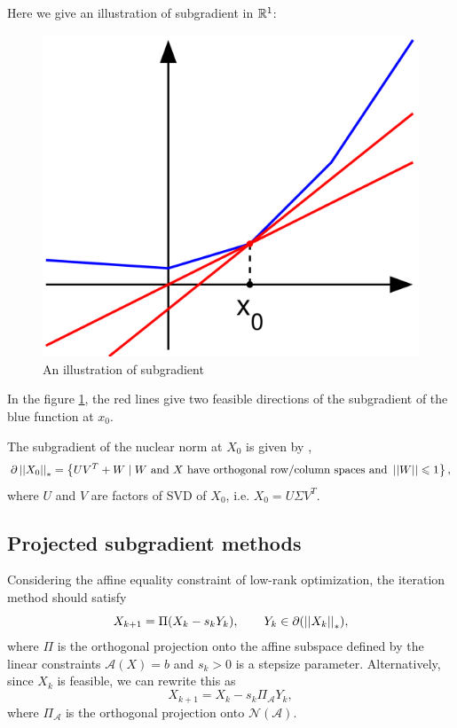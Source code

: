 \documentclass[11pt]{article}
\begin{document}
Here we give an illustration of subgradient in \(\mathbb R^1\):
\begin{figure}[H]
    \centering
    \includegraphics[scale=0.3]{img/Subderivative_illustration.png}
    \setlength{\abovecaptionskip}{0cm}
    \caption{An illustration of subgradient}
    \label{fig:subgradient}
\end{figure}

In the figure \ref{fig:subgradient}, the red lines give two feasible directions of the subgradient of the blue function at \(x_0\).

\begin{proposition}
    The subgradient of the nuclear norm at \(X_0\) is given by \cite{lewis2003mathematics},\cite{watson1992characterization}
    \[\partial \left|\left|X_0\right|\right|_* = \left\{UV^T+W \mid W \textnormal{ and } X\textnormal{ have orthogonal row/column spaces and } \left|\left|W\right|\right| \leqslant 1 \right\},\]
    where \(U\) and \(V\) are factors of SVD of \(X_0\), i.e. \(X_0=U\Sigma V^T.\)
\end{proposition}


\subsection{Projected subgradient methods}

Considering the affine equality constraint of low-rank optimization, the iteration method should satisfy
\[X_{k+1}= \Pi(X_k-s_k Y_k), \qquad Y_k \in \partial (\left|\left|X_k\right|\right|_*),\]
where \(\Pi\) is the orthogonal projection onto the affine subspace defined by the linear constraints \(\mathcal{A}(X)=b\) and \(s_{k}>0\) is a stepsize parameter. Alternatively, since \(X_{k}\) is feasible, we can rewrite this as
\[
X_{k+1}=X_{k}-s_{k} \Pi_{\mathcal{A}} Y_{k},
\]
where \(\Pi_{\mathcal{A}}\) is the orthogonal projection onto \(\mathcal{N}(\mathcal{A})\).
\end{document}
